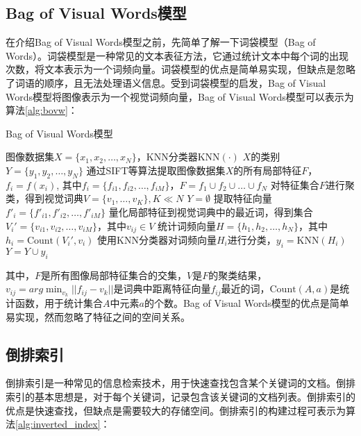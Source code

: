 \subsection{Bag of Visual Words模型}

在介绍Bag of Visual Words模型之前，先简单了解一下词袋模型（Bag of Words）。词袋模型是一种常见的文本表征方法，它通过统计文本中每个词的出现次数，将文本表示为一个词频向量。词袋模型的优点是简单易实现，但缺点是忽略了词语的顺序，且无法处理语义信息。受到词袋模型的启发，Bag of Visual Words模型将图像表示为一个视觉词频向量，Bag of Visual Words模型可以表示为算法\ref{alg:bovw}：

\begin{algorithm}[H]
    \caption{Bag of Visual Words模型}
    \label{alg:bovw}
    \begin{algorithmic}[1] %
        \Require 图像数据集$X=\{x_1,x_2,\dots,x_N\}$，KNN分类器$\text{KNN}(\cdot)$
        \Ensure $X$的类别$Y=\{y_1,y_2,\dots,y_N\}$
        \State 通过SIFT等算法提取图像数据集$X$的所有局部特征$F$，$f_i=f(x_i)$, 其中$f_i=\{f_{i1},f_{i2},\dots,f_{iM}\}$，$F=f_1\cup f_2\cup \dots \cup f_N$
        \State 对特征集合$F$进行聚类，得到视觉词典$V=\{v_1,\dots,v_K\}, K\ll N$
        \State $Y=\emptyset$
            \State 提取特征向量$f'_i=\{f'_{i1},f'_{i2},\dots,f'_{iM}\}$
            \State 量化局部特征到视觉词典中的最近词，得到集合$V_i'= \{v_{i1},v_{i2},\dots,v_{iM}\}$，其中$v_{ij}\in V$
            \State 统计词频向量$H=\{h_1,h_2,\dots,h_N\}$，其中$h_i=\text{Count}(V_i', v_{i})$
            \State 使用KNN分类器对词频向量$H_i$进行分类，$y_i=\text{KNN}(H_i)$
            \State $Y=Y \cup y_i$
        \EndFor
    \end{algorithmic}
\end{algorithm}

其中，$F$是所有图像局部特征集合的交集，$V$是$F$的聚类结果，$v_{ij}=arg\min_{v_k}||f_{ij}-v_k||$是词典中距离特征向量$f_{ij}$最近的词，$\text{Count}(A, a)$是统计函数，用于统计集合$A$中元素$a$的个数。Bag of Visual Words模型的优点是简单易实现，然而忽略了特征之间的空间关系。

\subsection{倒排索引}

倒排索引是一种常见的信息检索技术，用于快速查找包含某个关键词的文档。倒排索引的基本思想是，对于每个关键词，记录包含该关键词的文档列表。倒排索引的优点是快速查找，但缺点是需要较大的存储空间。倒排索引的构建过程可表示为算法\ref{alg:inverted_index}：

